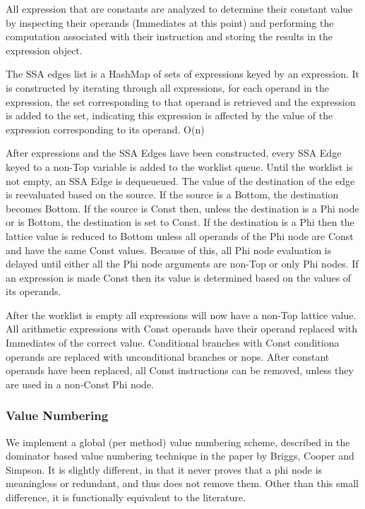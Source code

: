 \documentclass[12pt,letterpaper]{article}
\begin{document}
All expression that are constants are analyzed to determine their
constant value by inspecting their operands (Immediates at this point)
and performing the computation associated with their instruction and
storing the results in the expression object.

The SSA edges list is a HashMap of sets of expressions keyed by an
expression. It is constructed by iterating through all expressions,
for each operand in the expression, the set corresponding to that
operand is retrieved and the expression is added to the set,
indicating this expression is affected by the value of the expression
corresponding to its operand. O(n)

After expressions and the SSA Edges have been constructed, every SSA
Edge keyed to a non-Top variable is added to the worklist queue.
Until the worklist is not empty, an SSA Edge is dequeueued. The value
of the destination of the edge is reevaluated based on the source. If
the source is a Bottom, the destination becomes Bottom. If the source
is Const then, unless the destination is a Phi node or is Bottom, the
destination is set to Const. If the destination is a Phi then the
lattice value is reduced to Bottom unless all operands of the Phi node
are Const and have the same Const values. Because of this, all Phi
node evaluation is delayed until either all the Phi node arguments are
non-Top or only Phi nodes.  If an expression is made Const then its
value is determined based on the values of its operands.

After the worklist is empty all expressions will now have a non-Top
lattice value. All arithmetic expressions with Const operands have
their operand replaced with Immediates of the correct
value. Conditional branches with Const conditiona operands are
replaced with unconditional branches or nops.  After constant operands
have been replaced, all Const instructions can be removed, unless they
are used in a non-Const Phi node.

\subsubsection*{Value Numbering}

We implement a global (per method) value numbering scheme, described
in the dominator based value numbering technique in the paper by
Briggs, Cooper and Simpson. It is slightly different, in that it never
proves that a phi node is meaningless or redundant, and thus does not
remove them. Other than this small difference, it is functionally
equivalent to the literature.
\end{document}
